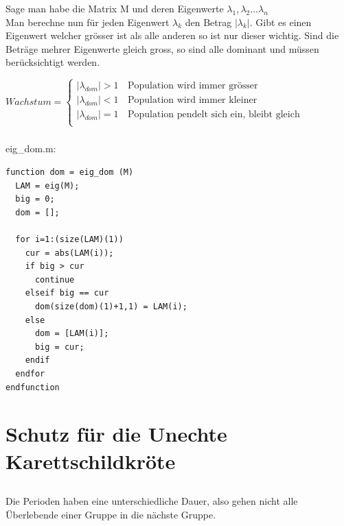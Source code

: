 \documentclass{article}
\begin{document}
\subsubsection{}
Sage man habe die Matrix M und deren Eigenwerte $\lambda_1, \lambda_2 ... \lambda_n$ \\
Man berechne nun für jeden Eigenwert $\lambda_k$ den Betrag $|\lambda_k|$. Gibt es einen Eigenwert welcher grösser ist als alle anderen so ist nur dieser wichtig. Sind die Beträge mehrer Eigenwerte gleich gross, so sind alle dominant und müssen berücksichtigt werden.

\vspace{5mm}

$Wachstum = \left\{
\begin{array}{ll}
|\lambda_{dom}| > 1 & \, \textrm{Population wird immer grösser} \\
|\lambda_{dom}| < 1 & \, \textrm{Population wird immer kleiner} \\
|\lambda_{dom}| = 1 & \, \textrm{Population pendelt sich ein, bleibt gleich} \\
\end{array}
\right. $

\subsubsection{}

eig\_dom.m:
\begin{lstlisting}
function dom = eig_dom (M)
  LAM = eig(M);
  big = 0;
  dom = [];
  
  for i=1:(size(LAM)(1))
    cur = abs(LAM(i));
    if big > cur
      continue
    elseif big == cur
      dom(size(dom)(1)+1,1) = LAM(i);
    else
      dom = [LAM(i)];
      big = cur;
    endif
  endfor
endfunction
\end{lstlisting}

\section{Schutz für die Unechte Karettschildkröte}
\subsection{}
\subsubsection{}
Die Perioden haben eine unterschiedliche Dauer, also gehen nicht alle Überlebende einer Gruppe in die nächste Gruppe.
\end{document}
